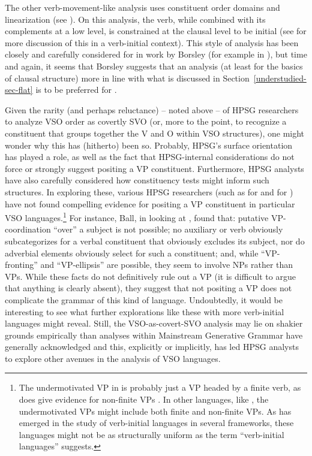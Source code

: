 \documentclass[output=paper
 	        ,biblatex
                ,babelshorthands
                ,newtxmath
                ,draftmode
                ,colorlinks, citecolor=brown
]{langscibook}
\begin{document}
The other verb-movement-like analysis uses constituent order domains and linearization (see ). On this analysis, the verb, while combined with its complements at a low level, is constrained at the clausal level to be initial (see \citealt{borsley06} for more discussion of this in a verb-initial context). This style of analysis has been closely and carefully considered for  in work by Borsley (for example in \citealt{Borsley89b,borsley95,Borsley2009a-u}), but time and again, it seems that Borsley suggests that an analysis (at least for the basics of clausal structure) more in line with what is discussed in Section~\ref{understudied-sec-flat} is to be preferred for .   

Given the rarity (and perhaps reluctance) -- noted above -- of HPSG researchers to analyze VSO order as covertly SVO (or, more to the point, to recognize a constituent that groups together the V and O within VSO structures), one might wonder why this has (hitherto) been so. Probably, HPSG's surface orientation has played a role, as well as the fact that HPSG-internal considerations do not force or strongly suggest positing a VP constituent. Furthermore, HPSG analysts have also carefully considered how constituency tests might inform such structures. In exploring these, various HPSG researchers (such as \citealt{borsley06} for  and \citealt[Chapter~3]{ball08thesis} for ) have not found compelling evidence for positing a VP constituent in particular VSO languages.\footnote{The undermotivated VP in  is probably just a VP headed by a finite verb, as  does give evidence for non-finite VPs \citep{BTW07}. In other languages, like , the undermotivated VPs might include both finite and non-finite VPs. As has emerged in the study of verb-initial languages in several frameworks, these languages might not be as structurally uniform as the term ``verb-initial languages'' suggests.} For instance, Ball, in looking at , found that: putative VP-coordination ``over'' a subject is not possible; no auxiliary or verb obviously subcategorizes for a verbal constituent that obviously excludes its subject, nor do adverbial elements obviously select for such a constituent; and, while ``VP-fronting'' and ``VP-ellipsis'' are possible, they seem to involve NPs rather than VPs. While these facts do not definitively rule out a VP (it is difficult to argue that anything is clearly absent), they suggest that not positing a VP does not complicate the grammar of this kind of language. Undoubtedly, it would be interesting to see what further explorations like these with more verb-initial languages might reveal. Still, the VSO-as-covert-SVO analysis may lie on shakier grounds empirically than analyses within Mainstream Generative Grammar have generally acknowledged and this, explicitly or implicitly, has led HPSG analysts to explore other avenues in the analysis of VSO languages.           
\end{document}
